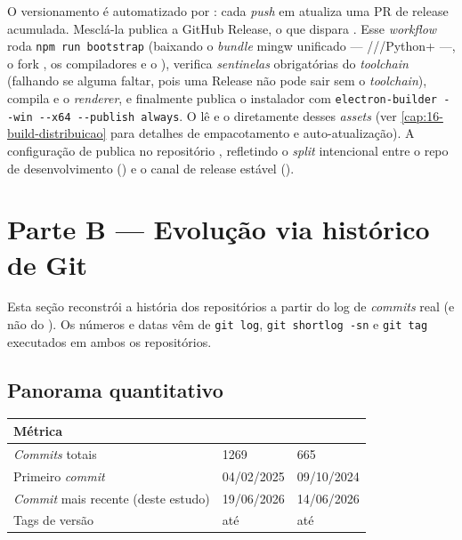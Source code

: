 O versionamento é automatizado por : cada \emph{push} em
 atualiza uma PR de release acumulada. Mesclá-la publica a GitHub
Release, o que dispara . Esse \emph{workflow} roda
\lstinline|npm run bootstrap| (baixando o \emph{bundle} mingw unificado ---
///Python+ ---, o fork
, os compiladores  e o ),
verifica \emph{sentinelas} obrigatórias do \emph{toolchain} (falhando se alguma
faltar, pois uma Release não pode sair sem o \emph{toolchain}), compila
 e o \emph{renderer}, e finalmente publica o instalador com
\lstinline|electron-builder --win --x64 --publish always|. O 
lê  e o  diretamente desses \emph{assets} (ver
\autoref{cap:16-build-distribuicao} para detalhes de empacotamento e
auto-atualização). A configuração  de  publica no
repositório , refletindo o \emph{split} intencional entre o repo de
desenvolvimento () e o canal de release estável ().

\section{Parte B --- Evolução via histórico de Git}
\label{sec:18-evolucao}

Esta seção reconstrói a história dos repositórios a partir do log de
\emph{commits} real (e não do ). Os números e datas vêm de
\lstinline|git log|, \lstinline|git shortlog -sn| e \lstinline|git tag|
executados em ambos os repositórios.

\subsection{Panorama quantitativo}
\label{sub:18-panorama}

\begin{tabularx}{\linewidth}{Y Y Y}
  \toprule
  \textbf{Métrica} &  &  \\
  \midrule
  \emph{Commits} totais & 1269 & 665 \\
  Primeiro \emph{commit} & 04/02/2025 & 09/10/2024 \\
  \emph{Commit} mais recente (deste estudo) & 19/06/2026 & 14/06/2026 \\
  Tags de versão & até  & até  \\
  \bottomrule
\end{tabularx}

